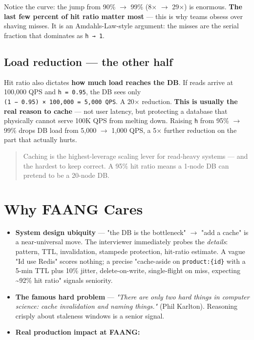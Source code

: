 \documentclass[11pt]{article}
\providecommand{\tightlist}{\setlength{\itemsep}{1pt}\setlength{\parskip}{0pt}}
\begin{document}
Notice the curve: the jump from 90\% \(\rightarrow\) 99\% (8\(\times\) \(\rightarrow\) 29\(\times\)) is enormous. \textbf{The last few percent of hit ratio matter most} --- this is why teams obsess over shaving misses. It is an Amdahl\textquotesingle s-Law-style argument: the misses are the serial fraction that dominates as \texttt{h\ →\ 1}.

\subsection{Load reduction --- the other half}\label{load-reduction--the-other-half}

Hit ratio also dictates \textbf{how much load reaches the DB}. If reads arrive at 100,000 QPS and \texttt{h\ =\ 0.95}, the DB sees only \texttt{(1\ −\ 0.95)\ ×\ 100,000\ =\ 5,000\ QPS}. A 20\(\times\) reduction. \textbf{This is usually the real reason to cache} --- not user latency, but protecting a database that physically cannot serve 100K QPS from melting down. Raising \texttt{h} from 95\% \(\rightarrow\) 99\% drops DB load from 5,000 \(\rightarrow\) 1,000 QPS, a 5\(\times\) further reduction on the part that actually hurts.

\begin{quote}
Caching is the highest-leverage scaling lever for read-heavy systems --- and the hardest to keep correct. A 95\% hit ratio means a 1-node DB can pretend to be a 20-node DB.
\end{quote}

\section{Why FAANG Cares}\label{why-faang-cares}

\begin{itemize}
\tightlist
\item
  \textbf{System design ubiquity} --- "the DB is the bottleneck" \(\rightarrow\) "add a cache" is a near-universal move. The interviewer immediately probes the \emph{details}: pattern, TTL, invalidation, stampede protection, hit-ratio estimate. A vague "I\textquotesingle d use Redis" scores nothing; a precise "cache-aside on \texttt{product:\{id\}} with a 5-min TTL plus 10\% jitter, delete-on-write, single-flight on miss, expecting \textasciitilde92\% hit ratio" signals seniority.
\item
  \textbf{The famous hard problem} --- \emph{"There are only two hard things in computer science: cache invalidation and naming things."} (Phil Karlton). Reasoning crisply about staleness windows is a senior signal.
\item
  \textbf{Real production impact at FAANG:}
\end{itemize}
\end{document}
